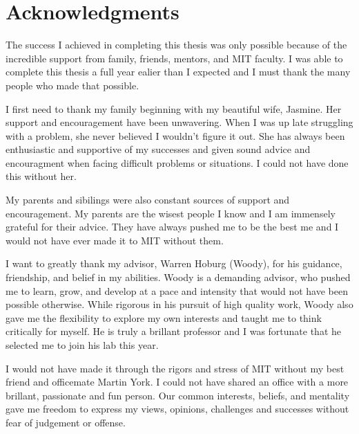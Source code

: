 % 

\cleardoublepage

\section*{Acknowledgments}

The success I achieved in completing this thesis was only possible because of the incredible support from family, friends, mentors, and MIT faculty.
I was able to complete this thesis a full year ealier than I expected and I must thank the many people who made that possible. 

I first need to thank my family beginning with my beautiful wife, Jasmine.  
Her support and encouragement have been unwavering.  
When I was up late struggling with a problem, she never believed I wouldn't figure it out.  
She has always been enthusiastic and supportive of my successes and given sound advice and encouragment when facing difficult problems or situations. 
I could not have done this without her. 

My parents and sibilings were also constant sources of support and encouragement. 
My parents are the wisest people I know and I am immensely grateful for their advice.  
They have always pushed me to be the best me and I would not have ever made it to MIT without them. 

I want to greatly thank my advisor, Warren Hoburg (Woody), for his guidance, friendship, and belief in my abilities.  
Woody is a demanding advisor, who pushed me to learn, grow, and develop at a pace and intensity that would not have been possible otherwise. 
While rigorous in his pursuit of high quality work, Woody also gave me the flexibility to explore my own interests and taught me to think critically for myself.
He is truly a brillant professor and I was fortunate that he selected me to join his lab this year. 

I would not have made it through the rigors and stress of MIT without my best friend and officemate Martin York. 
I could not have shared an office with a more brillant, passionate and fun person. 
Our common interests, beliefs, and mentality gave me freedom to express my views, opinions, challenges and successes without fear of judgement or offense. 

